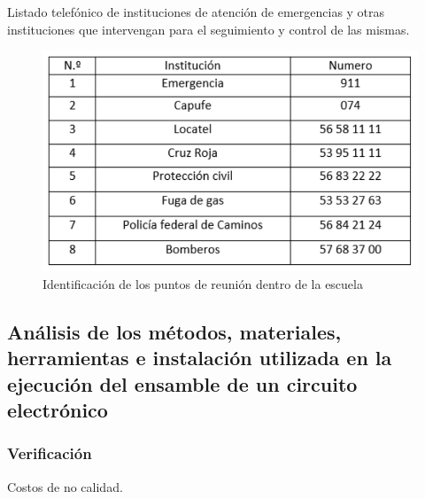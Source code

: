     Listado telefónico de instituciones de atención de emergencias y otras instituciones que intervengan para el seguimiento y control de las mismas.
    \begin{figure}[H]
        \centering
        \includegraphics[scale=0.25]{30/img/numerosDeEmergencia.pdf}
        \caption{Identificación de los puntos de reunión dentro de la escuela}
    \end{figure}
    
    \subsection{Análisis de los métodos, materiales, herramientas e instalación utilizada en la ejecución del ensamble de un circuito electrónico}
    
    \subsubsection{Verificación}
    
    Costos de no calidad.
